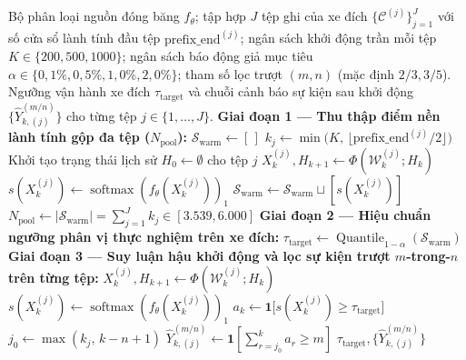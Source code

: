 \documentclass[12pt, a4paper, reqno, oneside]{book}
\begin{document}
\begin{algorithm}[htbp]
\caption{Hiệu chuẩn nền lành tính gộp đa tệp ($N_{\mathrm{pool}}$) kết hợp bộ lọc sự kiện trượt $m$-trong-$n$}\label{alg:benign-cal-mofn}
{\small\linespread{1.05}\selectfont
\begin{algorithmic}[1]
\Require Bộ phân loại nguồn đóng băng $f_\theta$; tập hợp $J$ tệp ghi của xe đích $\{\mathcal{C}^{(j)}\}_{j=1}^J$ với số cửa sổ lành tính đầu tệp $\mathrm{prefix\_end}^{(j)}$; ngân sách khởi động trần mỗi tệp $K \in \{200, 500, 1000\}$; ngân sách báo động giả mục tiêu $\alpha \in \{0{,}1\%, 0{,}5\%, 1{,}0\%, 2{,}0\%\}$; tham số lọc trượt $(m, n)$ (mặc định $2/3, 3/5$).
\Ensure Ngưỡng vận hành xe đích $\tau_{\mathrm{target}}$ và chuỗi cảnh báo sự kiện sau khởi động $\{\widehat{Y}_{k, (j)}^{(m/n)}\}$ cho từng tệp $j \in \{1, \ldots, J\}$.
\State \textbf{Giai đoạn 1 --- Thu thập điểm nền lành tính gộp đa tệp ($N_{\mathrm{pool}}$):}
\State $\mathcal{S}_{\mathrm{warm}} \leftarrow [\,]$ 
    \State $k_j \leftarrow \min\big(K,\, \lfloor \mathrm{prefix\_end}^{(j)} / 2 \rfloor\big)$ 
    \State Khởi tạo trạng thái lịch sử $H_0 \leftarrow \emptyset$ cho tệp $j$
        \State $X_k^{(j)}, H_{k+1} \leftarrow \Phi(\mathcal{W}_k^{(j)}; H_k)$ 
        \State $s(X_k^{(j)}) \leftarrow \operatorname{softmax}(f_\theta(X_k^{(j)}))_1$ 
        \State $\mathcal{S}_{\mathrm{warm}} \leftarrow \mathcal{S}_{\mathrm{warm}} \sqcup [s(X_k^{(j)})]$
    \EndFor
\EndFor
\State $N_{\mathrm{pool}} \leftarrow |\mathcal{S}_{\mathrm{warm}}| = \sum_{j=1}^J k_j \in [3.539, 6.000]$ 
\State \textbf{Giai đoạn 2 --- Hiệu chuẩn ngưỡng phân vị thực nghiệm trên xe đích:}
\State $\tau_{\mathrm{target}} \leftarrow \operatorname{Quantile}_{1-\alpha}(\mathcal{S}_{\mathrm{warm}})$ 
\State \textbf{Giai đoạn 3 --- Suy luận hậu khởi động và lọc sự kiện trượt $m$-trong-$n$ trên từng tệp:}
        \State $X_k^{(j)}, H_{k+1} \leftarrow \Phi(\mathcal{W}_k^{(j)}; H_k)$
        \State $s(X_k^{(j)}) \leftarrow \operatorname{softmax}(f_\theta(X_k^{(j)}))_1$
        \State $a_k \leftarrow \mathbf{1}\big[s(X_k^{(j)}) \ge \tau_{\mathrm{target}}\big]$ 
        \State $j_0 \leftarrow \max(k_j,\, k - n + 1)$
        \State $\widehat{Y}_{k, (j)}^{(m/n)} \leftarrow \mathbf{1}\left[\sum_{r=j_0}^{k} a_r \ge m\right]$ 
    \EndFor
\EndFor
\State \Return $\tau_{\mathrm{target}}, \{\widehat{Y}_{k, (j)}^{(m/n)}\}$
\end{algorithmic}}
\end{algorithm}
\end{document}
